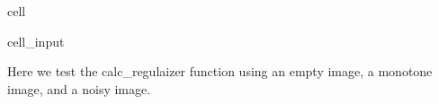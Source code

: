 \documentclass[letterpaper,10pt,english]{jupyterBook}
\begin{document}
\begin{sphinxuseclass}{cell}
\begin{sphinxVerbatimInput}
\begin{sphinxuseclass}{cell_input}
\begin{sphinxVerbatim}[commandchars=\\\{\}]
           
           
          
       
\end{sphinxVerbatim}

\end{sphinxuseclass}\end{sphinxVerbatimInput}

\end{sphinxuseclass}
\sphinxAtStartPar
Here we test the calc\_regulaizer function using an empty image, a monotone image, and a noisy image.
\end{document}
